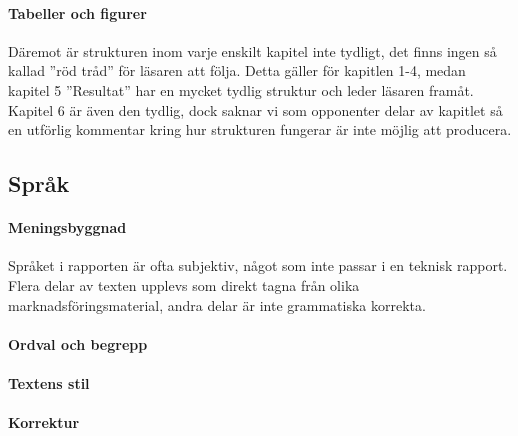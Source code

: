     \paragraph{Tabeller och figurer}

    
        Däremot är strukturen inom varje enskilt kapitel inte tydligt, det finns ingen så kallad ''röd tråd'' för läsaren att följa. Detta gäller för kapitlen 1-4, medan kapitel 5 ''Resultat'' har en mycket tydlig struktur och leder läsaren framåt. Kapitel 6 är även den tydlig, dock saknar vi som opponenter delar av kapitlet så en utförlig kommentar kring hur strukturen fungerar är inte möjlig att producera.


    \subsection{Språk} %
    \label{sub:sprak}

    \paragraph{Meningsbyggnad}
        Språket i rapporten är ofta subjektiv, något som inte passar i en teknisk rapport. Flera delar av texten upplevs som direkt tagna från olika marknadsföringsmaterial, andra delar är inte grammatiska korrekta.

    \paragraph{Ordval och begrepp}

    \paragraph{Textens stil}

    \paragraph{Korrektur}



